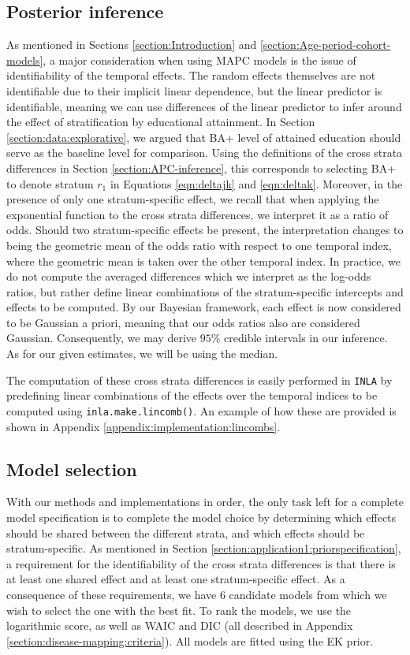 \subsection{Posterior inference}
\label{section:application1:posteriorInference}
As mentioned in Sections \ref{section:Introduction} and \ref{section:Age-period-cohort-models}, a major consideration when using MAPC models is the issue of identifiability of the temporal effects. The random effects themselves are not identifiable due to their implicit linear dependence, but the linear predictor is identifiable, meaning we can use differences of the linear predictor to infer around the effect of stratification by educational attainment. In Section \ref{section:data:explorative}, we argued that BA+ level of attained education should serve as the baseline level for comparison. Using the definitions of the cross strata differences in Section \ref{section:APC-inference}, this corresponds to selecting BA+ to denote stratum $r_1$ in Equations \eqref{eqn:deltajk} and \eqref{eqn:deltak}. Moreover, in the presence of only one stratum-specific effect, we recall that when applying the exponential function to the cross strata differences, we interpret it as a ratio of odds. Should two stratum-specific effects be present, the interpretation changes to being the geometric mean of the odds ratio with respect to one temporal index, where the geometric mean is taken over the other temporal index. In practice, we do not compute the averaged differences which we interpret as the log-odds ratios, but rather define linear combinations of the stratum-specific intercepts and effects to be computed. By our Bayesian framework, each effect is now considered to be Gaussian a priori, meaning that our odds ratios also are considered Gaussian. Consequently, we may derive $95\%$ credible intervals in our inference. As for our given estimates, we will be using the median.  

The computation of these cross strata differences is easily performed in \texttt{INLA} by predefining linear combinations of the effects over the temporal indices to be computed using \texttt{inla.make.lincomb()}. An example of how these are provided is shown in Appendix \ref{appendix:implementation:lincombs}.

\FloatBarrier
\subsection{Model selection}
\label{section:model-selection}
With our methods and implementations in order, the only task left for a complete model specification is to complete the model choice by determining which effects should be shared between the different strata, and which effects should be stratum-specific. As mentioned in Section \ref{section:application1:priorspecification}, a requirement for the identifiability of the cross strata differences is that there is at least one shared effect and at least one stratum-specific effect. As a consequence of these requirements, we have $6$ candidate models from which we wish to select the one with the best fit. To rank the models, we use the logarithmic score, as well as WAIC and DIC (all described in Appendix \ref{section:disease-mapping:criteria}). All models are fitted using the EK prior.

